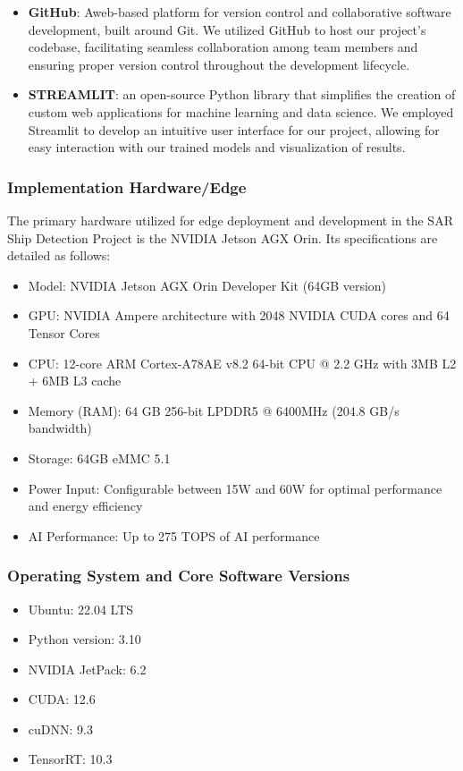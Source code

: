 \documentclass{article}
\begin{document}
\begin{itemize}
		\item \textbf{GitHub}:
		Aweb-based platform for version control and collaborative software development, built around Git. We utilized GitHub to host our project's codebase, facilitating seamless collaboration among team members and ensuring proper version control throughout the development lifecycle. \item \textbf{STREAMLIT}: an open-source Python library that simplifies the creation of custom web applications for machine learning and data science. We employed Streamlit to develop an intuitive user interface for our project, allowing for easy interaction with our trained models and visualization of results. \end{itemize}
	
	\subsubsection{Implementation Hardware/Edge}
	The primary hardware utilized for edge deployment and development in the SAR Ship Detection Project is the NVIDIA Jetson AGX Orin. Its specifications are detailed as follows: 
	\begin{itemize}
		\item Model: NVIDIA Jetson AGX Orin Developer Kit (64GB version)
		\item GPU: NVIDIA Ampere architecture with 2048 NVIDIA CUDA cores and 64 Tensor Cores
		\item CPU: 12-core ARM Cortex-A78AE v8.2 64-bit CPU @ 2.2 GHz with 3MB L2 + 6MB L3 cache
		\item Memory (RAM): 64 GB 256-bit LPDDR5 @ 6400MHz (204.8 GB/s bandwidth)
		\item Storage: 64GB eMMC 5.1
		\item Power Input: Configurable between 15W and 60W for optimal performance and energy efficiency
		\item AI Performance: Up to 275 TOPS of AI performance
	\end{itemize}
	
	
	\subsubsection{Operating System and Core Software Versions}
	\begin{itemize}
		\item 	Ubuntu: 22.04 LTS
		\item 	Python version: 3.10
		\item 	NVIDIA JetPack: 6.2
		\item 	CUDA: 12.6
		\item 	cuDNN: 9.3
		\item 	TensorRT: 10.3
		
	\end{itemize}
	
\end{document}
